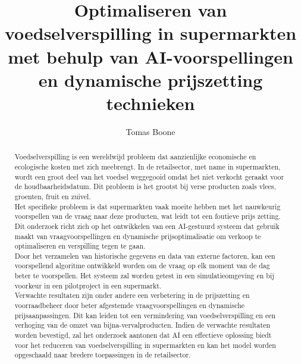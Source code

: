 \documentclass{hogent-article}
\title{Optimaliseren van voedselverspilling in supermarkten met behulp van AI-voorspellingen en dynamische prijszetting technieken}
\author{Tomas Boone}
\begin{document}
    \begin{abstract}

Voedselverspilling is een wereldwijd probleem dat aanzienlijke economische en ecologische kosten met zich meebrengt.
In de retailsector, met name in supermarkten, wordt een groot deel van het voedsel weggegooid omdat het niet verkocht geraakt voor de houdbaarheidsdatum.
Dit probleem is het grootst bij verse producten zoals vlees, groenten, fruit en zuivel.
\\
Het specifieke probleem is dat supermarkten vaak moeite hebben met het nauwkeurig voorspellen van de vraag naar deze producten, wat leidt tot een foutieve prijs zetting.
Dit onderzoek richt zich op het ontwikkelen van een AI-gestuurd systeem dat gebruik maakt van vraagvoorspellingen en dynamische prijsoptimalisatie om verkoop te optimaliseren en verspilling tegen te gaan.
\\
Door het verzamelen van historische gegevens en data van externe factoren, kan een voorspellend algoritme ontwikkeld worden om de vraag op elk moment van de dag beter te voorspellen.
Het systeem zal worden getest in een simulatieomgeving en bij voorkeur in een pilotproject in een supermarkt.
\\
Verwachte resultaten zijn onder andere een verbetering in de prijszetting en voorraadbeheer door beter afgestemde vraagvoorspellingen en dynamische prijsaanpassingen.
Dit kan leiden tot een vermindering van voedselverspilling en een verhoging van de omzet van bijna-vervalproducten.
Indien de verwachte resultaten worden bevestigd, zal het onderzoek aantonen dat AI een effectieve oplossing biedt voor het reduceren van voedselverspilling in supermarkten en kan het model worden opgeschaald naar bredere toepassingen in de retailsector.

    \end{abstract}

    \tableofcontents

    

    \printbibliography[heading=bibintoc]
\end{document}
